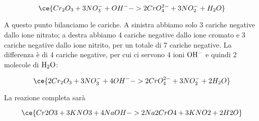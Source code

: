$$\ce{Cr_2O_3 + 3NO_3^- + OH^- -> 2CrO_4^{2-} + 3NO_2^- + H_2O}$$

A questo punto bilanciamo le cariche. A sinistra abbiamo solo 3 cariche negative dallo ione nitrato; a destra abbiamo 4 cariche negative dallo ione cromato e 3 cariche negative dallo ione nitrito, per un totale di 7 cariche negative. La differenza è di 4 cariche negative, per cui ci servono 4 ioni $\rm OH^-$ e quindi 2 molecole di $\rm H_2O$:

$$\ce{2Cr_2O_3 + 3NO_3^- + 4OH^- -> 2CrO_4^{2-} + 3NO_2^- + 2H_2O}$$

La reazione completa sarà

$$\ce{Cr2O3 + 3KNO3 + 4NaOH -> 2Na2CrO4 + 3KNO2 + 2H2O}$$